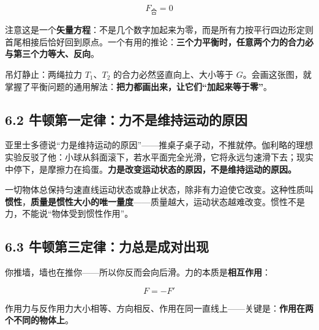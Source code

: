 \documentclass[UTF8,a4paper,11pt]{ctexart}
\begin{document}
\[
F_{\text{合}} = 0
\]

注意这是一个\textbf{矢量方程}：不是几个数字加起来为零，而是所有力按平行四边形定则首尾相接后恰好回到原点。一个有用的推论：\textbf{三个力平衡时，任意两个力的合力必与第三个力等大、反向}。

\begin{center}
\end{center}

吊灯静止：两绳拉力 $T_1$、$T_2$ 的合力必然竖直向上、大小等于 $G$。会画这张图，就掌握了平衡问题的通用解法：\textbf{把力都画出来，让它们“加起来等于零”}。

\subsection*{6.2 牛顿第一定律：力不是维持运动的原因}

亚里士多德说“力是维持运动的原因”——推桌子桌子动，不推就停。伽利略的理想实验反驳了他：小球从斜面滚下，若水平面完全光滑，它将永远匀速滑下去；现实中停下，是摩擦力在捣蛋。\textbf{力是改变运动状态的原因，不是维持运动的原因。}

\begin{keyconcept}[惯性]
一切物体总保持匀速直线运动状态或静止状态，除非有力迫使它改变。这种性质叫\textbf{惯性}，\textbf{质量是惯性大小的唯一量度}——质量越大，运动状态越难改变。惯性不是力，不能说“物体受到惯性作用”。
\end{keyconcept}

\subsection*{6.3 牛顿第三定律：力总是成对出现}

你推墙，墙也在推你——所以你反而会向后滑。力的本质是\textbf{相互作用}：

\[
F = -F'
\]

作用力与反作用力大小相等、方向相反、作用在同一直线上——关键是：\textbf{作用在两个不同的物体上}。
\end{document}

